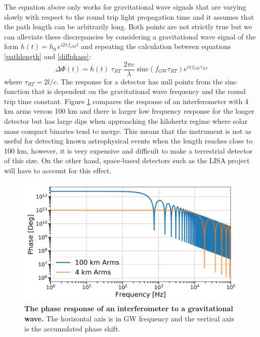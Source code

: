 	The equation above only works for gravitational wave signals that are varying slowly with respect to the round trip light propagation time and it assumes that the path length can be arbitrarily long. Both points are not strictly true \cite{Saulson} but we can alleviate these discrepancies by considering a gravitational wave signal of the form $h(t) = h_0 \, e^{i 2 \pi f_{GW} t}$  and repeating the calculation between equations \ref{pathlength} and \ref{diffphase}:
	\begin{equation}\label{gwsinc}
	\Delta \Phi (t) = h(t) \; \tau_{RT} \; \frac{2 \pi c}{\lambda} \; \text{sinc}(f_{GW} \tau_{RT}) e^{i \pi f_{GW} \tau_{RT}}
	\end{equation}
	where $\tau_{RT} = 2l/c$.  The response for a detector has null points from the sinc function that is dependent on the gravitational wave frequency and the round trip time constant. Figure \ref{fig:sincgw} compares the response of an interferometer with 4 km arms versus 100 km and there is larger low frequency response for the longer detector but has large dips when approaching the kilohertz regime where solar mass compact binaries tend to merge.  This means that the instrument is not as useful for detecting known astrophysical events \cite{Finn:1995} when the length reaches close to 100 km, however, it is very expensive and difficult to make a terrestrial detector of this size.  On the other hand, space-based detectors such as the LISA project will have to account for this effect.
	\begin{figure}[ht]
		\centering
		\includegraphics[width=.7 \textwidth]{../Figures/SincGW.png}
		\caption[The phase response of an interferometer to a gravitational wave.]  
		{\textbf{The phase response of an interferometer to a gravitational wave.} The horizontal axis is in GW frequency and the vertical axis is the accumulated phase shift.}
		\label{fig:sincgw}
	\end{figure}

